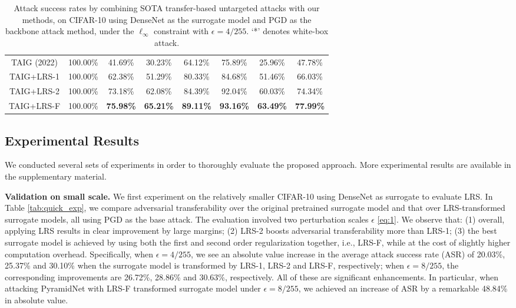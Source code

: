 \documentclass[letterpaper]{article} %
\theoremstyle{plain}
\theoremstyle{definition}
\begin{document}
\begin{table}[ht!]
\begin{center}
{\begin{tabular}{c|c|cccccc}
TAIG (2022)     & {100.00\%} & 41.69\% & 30.23\% &64.12\% & 75.89\% & 25.96\%    & {47.78\%} \\
TAIG+LRS-1     & {100.00\%} & 62.38\% & 51.29\% &80.33\% & 84.68\% & 51.46\%    & {66.03\%} \\
TAIG+LRS-2     & {100.00\%} & 73.18\% & 62.08\% &84.39\% & 92.04\% & 60.03\%    & {74.34\%} \\
TAIG+LRS-F     & {100.00\%} & \textbf{75.98\%} & \textbf{65.21\%} &\textbf{89.11\%} & \textbf{93.16\%} & \textbf{63.49\%}    & \textbf{77.99\%} \\
\bottomrule
\end{tabular}}
\caption{Attack success rates by combining SOTA transfer-based untargeted attacks with our methods, on CIFAR-10 using DenseNet as the surrogate model and PGD as the backbone attack method, under the $\ell_\infty$ constraint with $\epsilon=4/255$. `*' denotes white-box attack.}
\label{tab:combine_cifar10}
\end{center}
\end{table}


\subsection{Experimental Results}
We conducted several sets of experiments in order to thoroughly evaluate the proposed approach. More experimental results are available in the supplementary material.

\textbf{Validation on small scale.}
We first experiment on the relatively smaller CIFAR-10 using DenseNet as surrogate to evaluate LRS. %
In Table \ref{tab:quick_exp}, we compare adversarial transferability over the original pretrained surrogate model and that over LRS-transformed surrogate models, all using PGD as the base attack. The evaluation involved two perturbation scales $\epsilon$ \eqref{eq:1}. We observe that: (1) overall, applying LRS results in clear improvement by large margins; (2) LRS-2 boosts adversarial transferability more than LRS-1; (3) the best surrogate model is achieved by using both the first and second order regularization together, i.e., LRS-F, while at the cost of slightly higher computation overhead. Specifically, when $\epsilon=4/255$, we see an absolute value increase in the average attack success rate (ASR) of 20.03\%, 25.37\% and 30.10\% when the surrogate model is transformed by LRS-1, LRS-2 and LRS-F, respectively; when $\epsilon=8/255$, the corresponding improvements are 26.72\%, 28.86\% and 30.63\%, respectively. All of these are significant enhancements. In particular, when attacking PyramidNet with LRS-F transformed surrogate model under $\epsilon=8/255$, we achieved an increase of ASR by a remarkable 48.84\% in absolute value.
\end{document}

